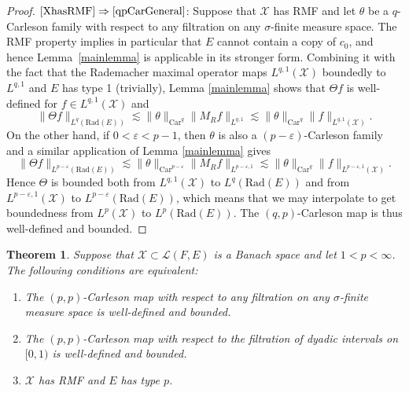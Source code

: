 \documentclass[a4paper,10pt]{amsart}
\theoremstyle{plain}
\newtheorem{theorem}{Theorem}
\theoremstyle{definition}
\theoremstyle{remark}
\begin{document}
\begin{proof}
    $\eqref{XhasRMF}\Rightarrow\eqref{qpCarGeneral}$: Suppose that $\mathcal{X}$ has RMF and let
    $\theta$ be a $q$-Carleson family with respect to any filtration on any $\sigma$-finite measure space.
    The RMF property implies in particular that $E$ cannot contain a copy of $c_0$, and hence Lemma~\ref{mainlemma} is applicable in its stronger form.
    Combining it with the fact that the Rademacher maximal operator maps $L^{q,1}(\mathcal{X})$
    boundedly to $L^{q,1}$ and $E$ has type 1 (trivially), Lemma \ref{mainlemma} shows that $\Theta f$ is well-defined for $f\in L^{q,1}(\mathcal{X})$ and
    \begin{equation*}
      \| \Theta f \|_{L^q(\text{Rad}(E))} \lesssim \| \theta \|_{\text{Car}^q} \| M_Rf \|_{L^{q,1}}
      \lesssim \| \theta \|_{\text{Car}^q} \| f \|_{L^{q,1}(\mathcal{X})} .
    \end{equation*}
    On the other hand, if $0 < \varepsilon < p - 1$, then $\theta$ is also a $(p - \varepsilon)$-Carleson family
    and a similar application of Lemma \ref{mainlemma} gives
    \begin{equation*}
      \| \Theta f \|_{L^{p-\varepsilon}(\text{Rad}(E))} 
      \lesssim \| \theta \|_{\text{Car}^{p-\varepsilon}} \| M_Rf \|_{L^{p-\varepsilon , 1}}
      \lesssim \| \theta \|_{\text{Car}^q} \| f \|_{L^{p-\varepsilon , 1}(\mathcal{X})} .
    \end{equation*}
    Hence $\Theta$ is bounded both from $L^{q,1}(\mathcal{X})$ to $L^q(\text{Rad}(E))$ and
    from $L^{p-\varepsilon , 1}(\mathcal{X})$ to $L^{p-\varepsilon}(\text{Rad}(E))$, which means that we may interpolate
    to get boundedness from $L^p(\mathcal{X})$ to $L^p(\text{Rad}(E))$. The $(q,p)$-Carleson map is thus
    well-defined and bounded.
  \end{proof}

\begin{theorem}
\label{mainthm2}
  Suppose that $\mathcal{X}\subset\mathcal{L}(F,E)$ is a Banach space 
  and let $1 < p < \infty$. The following conditions are equivalent:
  \begin{enumerate}
    \item\label{ppCarGeneral} The $(p,p)$-Carleson map 
          with respect to any filtration on any $\sigma$-finite measure space is well-defined and bounded.
    \item\label{ppCarDyadic} The $(p,p)$-Carleson map 
          with respect to the filtration of dyadic intervals on $[0,1)$ is well-defined and bounded.
    \item\label{XhasRMFandType} $\mathcal{X}$ has RMF and $E$ has type $p$.
  \end{enumerate}
\end{theorem}
\end{document}
